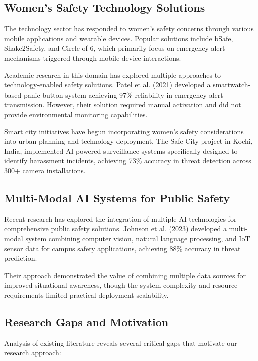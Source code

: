 \documentclass[12pt,a4paper]{article}
\begin{document}
\subsection{Women's Safety Technology Solutions}

The technology sector has responded to women's safety concerns through various mobile applications and wearable devices. Popular solutions include bSafe, Shake2Safety, and Circle of 6, which primarily focus on emergency alert mechanisms triggered through mobile device interactions.

Academic research in this domain has explored multiple approaches to technology-enabled safety solutions. Patel et al. (2021) developed a smartwatch-based panic button system achieving 97\% reliability in emergency alert transmission. However, their solution required manual activation and did not provide environmental monitoring capabilities.

Smart city initiatives have begun incorporating women's safety considerations into urban planning and technology deployment. The Safe City project in Kochi, India, implemented AI-powered surveillance systems specifically designed to identify harassment incidents, achieving 73\% accuracy in threat detection across 300+ camera installations.

\subsection{Multi-Modal AI Systems for Public Safety}

Recent research has explored the integration of multiple AI technologies for comprehensive public safety solutions. Johnson et al. (2023) developed a multi-modal system combining computer vision, natural language processing, and IoT sensor data for campus safety applications, achieving 88\% accuracy in threat prediction.

Their approach demonstrated the value of combining multiple data sources for improved situational awareness, though the system complexity and resource requirements limited practical deployment scalability.

\subsection{Research Gaps and Motivation}

Analysis of existing literature reveals several critical gaps that motivate our research approach:
\end{document}
